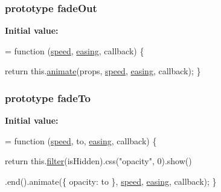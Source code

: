 \subsubsection[{\texorpdfstring{fade\+Out}{fadeOut}}]{ {\bf prototype} fade\+Out}\hypertarget{jquery-2_82_81-vsdoc_8js_ab5b944777329a41646b2c3d6f26af153}{}\label{jquery-2_82_81-vsdoc_8js_ab5b944777329a41646b2c3d6f26af153}
{\bfseries Initial value\+:}
\begin{DoxyCode}
= \textcolor{keyword}{function} (\hyperlink{jquery-2_82_81-vsdoc_8js_add98c90065e6563cba26ff6d2016c46c}{speed}, \hyperlink{jquery-2_82_81-vsdoc_8js_a9758a312629fa6de1744280dd6e6253b}{easing}, callback) \{
        

        \textcolor{keywordflow}{return} this.\hyperlink{jquery-2_82_81-vsdoc_8js_a956a1d08128d41115c45b6815814a64d}{animate}(props, \hyperlink{jquery-2_82_81-vsdoc_8js_add98c90065e6563cba26ff6d2016c46c}{speed}, \hyperlink{jquery-2_82_81-vsdoc_8js_a9758a312629fa6de1744280dd6e6253b}{easing}, callback);
    \}
\end{DoxyCode}
\subsubsection[{\texorpdfstring{fade\+To}{fadeTo}}]{ {\bf prototype} fade\+To}\hypertarget{jquery-2_82_81-vsdoc_8js_a3e1ca57624879f2353f88a9b747aa8dc}{}\label{jquery-2_82_81-vsdoc_8js_a3e1ca57624879f2353f88a9b747aa8dc}
{\bfseries Initial value\+:}
\begin{DoxyCode}
= \textcolor{keyword}{function} (\hyperlink{jquery-2_82_81-vsdoc_8js_add98c90065e6563cba26ff6d2016c46c}{speed}, to, \hyperlink{jquery-2_82_81-vsdoc_8js_a9758a312629fa6de1744280dd6e6253b}{easing}, callback) \{
        


        
        \textcolor{keywordflow}{return} this.\hyperlink{jquery-2_82_81-vsdoc_8js_ac99d0cf56cab46114f5765a14e03ad6d}{filter}(isHidden).css(\textcolor{stringliteral}{"opacity"}, 0).show()

            
            .end().animate(\{ opacity: to \}, \hyperlink{jquery-2_82_81-vsdoc_8js_add98c90065e6563cba26ff6d2016c46c}{speed}, \hyperlink{jquery-2_82_81-vsdoc_8js_a9758a312629fa6de1744280dd6e6253b}{easing}, callback);
    \}
\end{DoxyCode}
